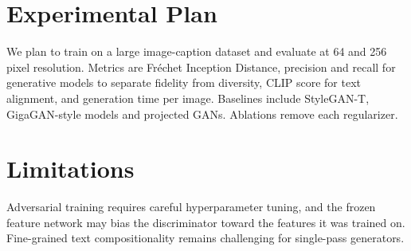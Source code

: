 \documentclass{article}
\begin{document}
\section{Experimental Plan}
We plan to train on a large image-caption dataset and evaluate at 64 and 256
pixel resolution. Metrics are Fréchet Inception Distance, precision and recall
for generative models to separate fidelity from diversity, CLIP score for text
alignment, and generation time per image. Baselines include StyleGAN-T,
GigaGAN-style models and projected GANs. Ablations remove each regularizer.

\section{Limitations}
Adversarial training requires careful hyperparameter tuning, and the frozen
feature network may bias the discriminator toward the features it was trained
on. Fine-grained text compositionality remains challenging for single-pass
generators.
\end{document}
